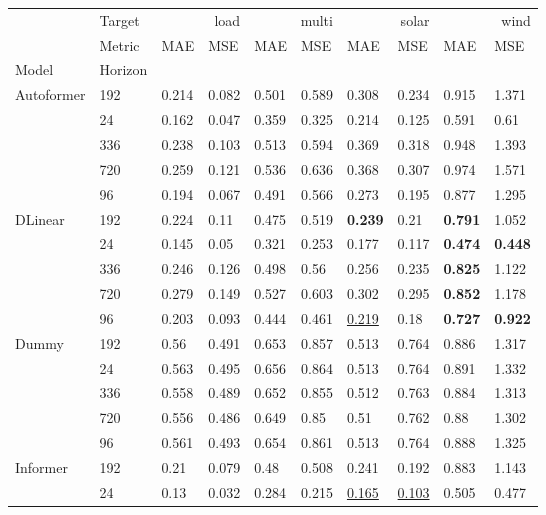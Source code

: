 \begin{tabular}{llllllllll}
\toprule
 & Target & \multicolumn{2}{r}{load} & \multicolumn{2}{r}{multi} & \multicolumn{2}{r}{solar} & \multicolumn{2}{r}{wind} \\
 & Metric & MAE & MSE & MAE & MSE & MAE & MSE & MAE & MSE \\
Model & Horizon &  &  &  &  &  &  &  &  \\
\midrule
\multirow[t]{5}{*}{Autoformer} & 192 & 0.214 & 0.082 & 0.501 & 0.589 & 0.308 & 0.234 & 0.915 & 1.371 \\
 & 24 & 0.162 & 0.047 & 0.359 & 0.325 & 0.214 & 0.125 & 0.591 & 0.61 \\
 & 336 & 0.238 & 0.103 & 0.513 & 0.594 & 0.369 & 0.318 & 0.948 & 1.393 \\
 & 720 & 0.259 & 0.121 & 0.536 & 0.636 & 0.368 & 0.307 & 0.974 & 1.571 \\
 & 96 & 0.194 & 0.067 & 0.491 & 0.566 & 0.273 & 0.195 & 0.877 & 1.295 \\
\cline{1-10}
\multirow[t]{5}{*}{DLinear} & 192 & 0.224 & 0.11 & 0.475 & 0.519 & \textbf{0.239} & 0.21 & \textbf{0.791} & 1.052 \\
 & 24 & 0.145 & 0.05 & 0.321 & 0.253 & 0.177 & 0.117 & \textbf{0.474} & \textbf{0.448} \\
 & 336 & 0.246 & 0.126 & 0.498 & 0.56 & 0.256 & 0.235 & \textbf{0.825} & 1.122 \\
 & 720 & 0.279 & 0.149 & 0.527 & 0.603 & 0.302 & 0.295 & \textbf{0.852} & 1.178 \\
 & 96 & 0.203 & 0.093 & 0.444 & 0.461 & \underline{0.219} & 0.18 & \textbf{0.727} & \textbf{0.922} \\
\cline{1-10}
\multirow[t]{5}{*}{Dummy} & 192 & 0.56 & 0.491 & 0.653 & 0.857 & 0.513 & 0.764 & 0.886 & 1.317 \\
 & 24 & 0.563 & 0.495 & 0.656 & 0.864 & 0.513 & 0.764 & 0.891 & 1.332 \\
 & 336 & 0.558 & 0.489 & 0.652 & 0.855 & 0.512 & 0.763 & 0.884 & 1.313 \\
 & 720 & 0.556 & 0.486 & 0.649 & 0.85 & 0.51 & 0.762 & 0.88 & 1.302 \\
 & 96 & 0.561 & 0.493 & 0.654 & 0.861 & 0.513 & 0.764 & 0.888 & 1.325 \\
\cline{1-10}
\multirow[t]{5}{*}{Informer} & 192 & 0.21 & 0.079 & 0.48 & 0.508 & 0.241 & 0.192 & 0.883 & 1.143 \\
 & 24 & 0.13 & 0.032 & 0.284 & 0.215 & \underline{0.165} & \underline{0.103} & 0.505 & 0.477 \\

\end{tabular}
